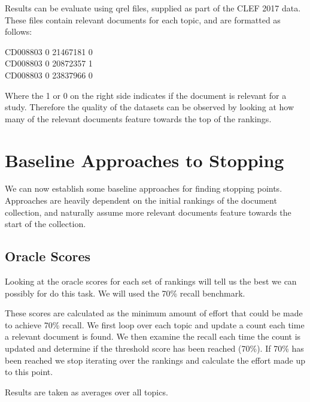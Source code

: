 Results can be evaluate using qrel files, supplied as part of the CLEF 2017 data. These files contain relevant documents for each topic, and are formatted as follows:

\begin{tcolorbox}
CD008803     0  21467181     0  \\
CD008803     0  20872357     1  \\
CD008803     0  23837966     0 
\end{tcolorbox}

Where the 1 or 0 on the right side indicates if the document is relevant for a study. Therefore the quality of the datasets can be observed by looking at how many of the relevant documents feature towards the top of the rankings.


\section{Baseline Approaches to Stopping} \label{baselineapp}

We can now establish some baseline approaches for finding stopping points. Approaches are heavily dependent on the initial rankings of the document collection, and naturally assume more relevant documents feature towards the start of the collection. 

\subsection{Oracle Scores} \label{oracleScores}

Looking at the oracle scores for each set of rankings will tell us the best we can possibly for do this task.  We will used the 70\% recall benchmark.

These scores are calculated as the minimum amount of effort that could be made to achieve 70\% recall. We first loop over each topic and update a count each time a relevant document is found. We then examine the recall each time the count is updated and determine if the threshold score has been reached (70\%). If 70\% has been reached we stop iterating over the rankings and calculate the effort made up to this point.

Results are taken as averages over all topics.

